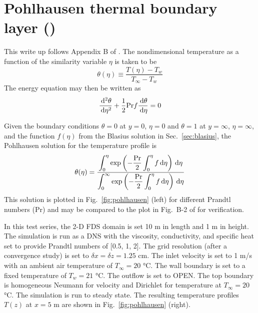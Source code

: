 \documentclass[11pt]{book}
\begin{document}
\section{Pohlhausen thermal boundary layer (\texorpdfstring{}{Pohlhausen})}
\label{sec:Pohlhausen}

This write up follows Appendix B of \cite{Holman:1}.  The nondimensional temperature as a function of the similarity variable $\eta$ is taken to be
\begin{equation}
\label{eq:pohl_theta}
\theta(\eta) \equiv \frac{T(\eta) - T_w}{T_\infty - T_w}
\end{equation}
The energy equation may then be written as
\begin{equation}
\label{eq:pohl_energy}
\frac{\,\mathrm{d}^2 \theta}{\,\mathrm{d}\eta^2} + \frac{1}{2} \mathrm{Pr} f \frac{\,\mathrm{d} \theta}{\,\mathrm{d} \eta} = 0
\end{equation}

Given the boundary conditions $\theta=0$ at $y=0$, $\eta=0$ and $\theta=1$ at $y=\infty$, $\eta=\infty$, and the function $f(\eta)$ from the Blasius solution in Sec.~\ref{sec:blasius}, the Pohlhausen solution for the temperature profile is
\begin{equation}
\label{eq:pohl_soln}
\theta(\eta) = \frac{\displaystyle \int_0^\eta \exp\left( - \frac{\mathrm{Pr}}{2} \int_0^\eta f \,\mathrm{d} \eta \right) \,\mathrm{d} \eta}{\displaystyle \int_0^\infty \exp\left( - \frac{\mathrm{Pr}}{2} \int_0^\eta f \,\mathrm{d} \eta \right)\,\mathrm{d} \eta}
\end{equation}
This solution is plotted in Fig.~\ref{fig:pohlhausen} (left) for different Prandtl numbers (Pr) and may be compared to the plot in Fig.~B-2 of \cite{Holman:1} for verification.

In this test series, the 2-D FDS domain is set 10 m in length and 1 m in height.  The simulation is run as a DNS with the viscosity, conductivity, and specific heat set to provide Prandtl numbers of [0.5, 1, 2].  The grid resolution (after a convergence study) is set to $\delta x=\delta z=1.25$ cm. The inlet velocity is set to 1 m/s with an ambient air temperature of $T_\infty=20$ \si{\degreeCelsius}. The wall boundary is set to a fixed temperature of $T_w=21$ \si{\degreeCelsius}. The outflow is set to {\ct OPEN}.  The top boundary is homogeneous Neumann for velocity and Dirichlet for temperature at $T_\infty=20$ \si{\degreeCelsius}.  The simulation is run to steady state.  The resulting temperature profiles $T(z)$ at $x=5$ m are shown in Fig.~\ref{fig:pohlhausen} (right).
\end{document}
